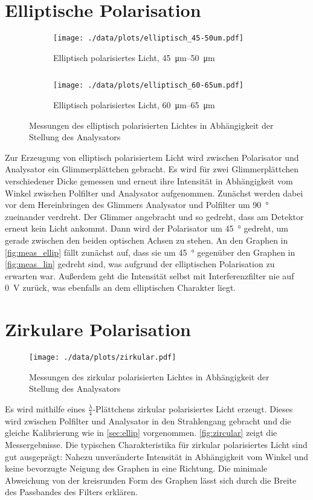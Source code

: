 \section{Elliptische Polarisation}\label{sec:ellip}
\begin{figure}[tb]
	\begin{subfigure}{.4\textwidth}
		\centering
		\texttt{[image: ./data/plots/elliptisch\_45-50um.pdf]}
		\caption[\SIrange{45}{50}{\micro\meter}]{Elliptisch polarisiertes Licht, \SIrange{45}{50}{\micro\meter}}
		\label{subfig:ellip_45_50}
	\end{subfigure}
	$\quad$
	\begin{subfigure}{.4\textwidth}
		\centering
		\texttt{[image: ./data/plots/elliptisch\_60-65um.pdf]}
		\caption[\SIrange{60}{65}{\micro\meter}]{Elliptisch polarisiertes Licht, \SIrange{60}{65}{\micro\meter}}
		\label{subfig:ellip_60_65}
	\end{subfigure}
	\caption[Elliptisch polarisiertes Licht]{Messungen des elliptisch polarisierten Lichtes in Abhängigkeit der Stellung des Analysators}
	\label{fig:meas_ellip}
\end{figure}
Zur Erzeugung von elliptisch polarisiertem Licht wird zwischen Polarisator und Analysator ein Glimmerplättchen gebracht.
Es wird für zwei Glimmerplättchen verschiedener Dicke gemessen und erneut ihre Intensität in Abhängigkeit vom Winkel zwischen Polfilter und Analysator aufgenommen.
Zunächst werden dabei vor dem Hereinbringen des Glimmers Analysator und Polfilter um \SI{90}{\degree} zueinander verdreht.
Der Glimmer angebracht und so gedreht, dass am Detektor erneut kein Licht ankommt.
Dann wird der Polarisator um \SI{45}{\degree} gedreht, um gerade zwischen den beiden optischen Achsen zu stehen.
An den Graphen in \autoref{fig:meas_ellip} fällt zunächst auf, dass sie um \SI{45}{\degree} gegenüber den Graphen in \autoref{fig:meas_lin} gedreht sind, was aufgrund der elliptischen Polarisation zu erwarten war.
Außerdem geht die Intensität selbst mit Interferenzfilter nie auf \SI{0}{\volt} zurück, was ebenfalls an dem elliptischen Charakter liegt.

\section{Zirkulare Polarisation}
\begin{figure}
	\centering
	\texttt{[image: ./data/plots/zirkular.pdf]}
	\caption[Zirkular polarisiertes Licht]{Messungen des zirkular polarisierten Lichtes in Abhängigkeit der Stellung des Analysators}
	\label{fig:zircular}
\end{figure}

Es wird mithilfe eines $\frac{\lambda}{4}$-Plättchens zirkular polarisiertes Licht erzeugt.
Dieses wird zwischen Polfilter und Analysator in den Strahlengang gebracht und die gleiche Kalibrierung wie in \autoref{sec:ellip} vorgenommen.
\autoref{fig:zircular} zeigt die Messergebnisse.
Die typischen Charakteristika für zirkular polarisiertes Licht sind gut ausgeprägt:
Nahezu unveränderte Intensität in Abhängigkeit vom Winkel und keine bevorzugte Neigung des Graphen in eine Richtung.
Die minimale Abweichung von der kreisrunden Form des Graphen lässt sich durch die Breite des Passbandes des Filters erklären.

